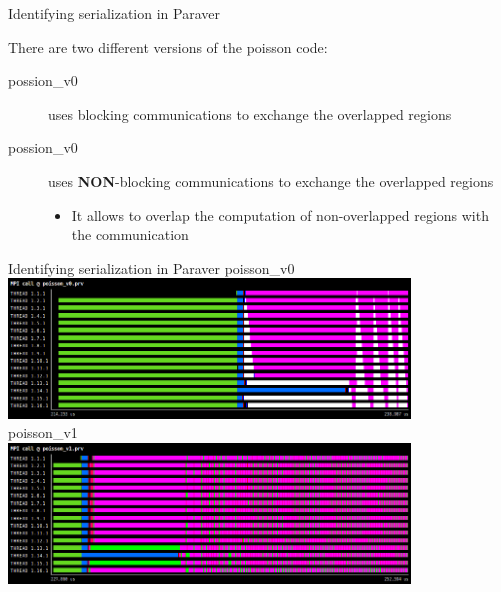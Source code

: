 \documentclass[10pt,xcolor=table]{beamer}
\begin{document}
\begin{frame}{Identifying serialization in Paraver}

There are two different versions of the poisson code:

\begin{description}
\item[possion\_v0] uses blocking communications to exchange the overlapped regions
\item[possion\_v0] uses {\bf NON}-blocking communications to exchange the overlapped regions
    \begin{itemize}
        \item It allows to overlap the computation of non-overlapped regions with the communication
    \end{itemize}
\end{description}
    
\end{frame}
\begin{frame}{Identifying serialization in Paraver}
\centering
poisson\_v0\\
\includegraphics[width=0.8\textwidth]{figs/MPI_call@poisson_v0.png}\\
poisson\_v1\\
\includegraphics[width=0.8\textwidth]{figs/MPI_call@poisson_v1.png}\\
\end{frame}
\end{document}
